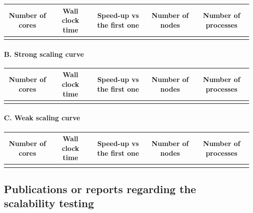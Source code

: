 \documentclass[a4paper,12pt]{article}
\newif\ifshowinstructions
\newcommand{\instructions}[1]{\ifshowinstructions {\fontsize{10}{11}\selectfont \textit{#1}} \fi}
\begin{document}
\begin{tabulary}{0.90\textwidth}{|c|c|c|c|c|}
  \hline
  Number of cores & Wall clock time & Speed-up vs the first one & Number of nodes & Number of processes \\
  \hline
                  &                 &                            &                 &                     \\
  \hline
\end{tabulary}

\paragraph*{\textbf{B. Strong scaling curve}}

\instructions{Please include the data in order to deploy the scalability curve when the number of processors varies for a fixed total problem size.}

\begin{tabulary}{0.90\textwidth}{|c|c|c|c|c|}
  \hline
  Number of cores & Wall clock time & Speed-up vs the first one & Number of nodes & Number of processes \\
  \hline
                  &                 &                            &                 &                     \\
  \hline
\end{tabulary}

\paragraph*{\textbf{C. Weak scaling curve}}

\instructions{Please include the data in order to deploy the scalability curve when the number of processors varies for a fixed problem size per processor.}

\begin{tabulary}{0.90\textwidth}{|c|c|c|c|c|}
  \hline
  Number of cores & Wall clock time & Speed-up vs the first one & Number of nodes & Number of processes \\
  \hline
                  &                 &                            &                 &                     \\
  \hline
\end{tabulary}

\subsection{Publications or reports regarding the scalability testing}
\end{document}
